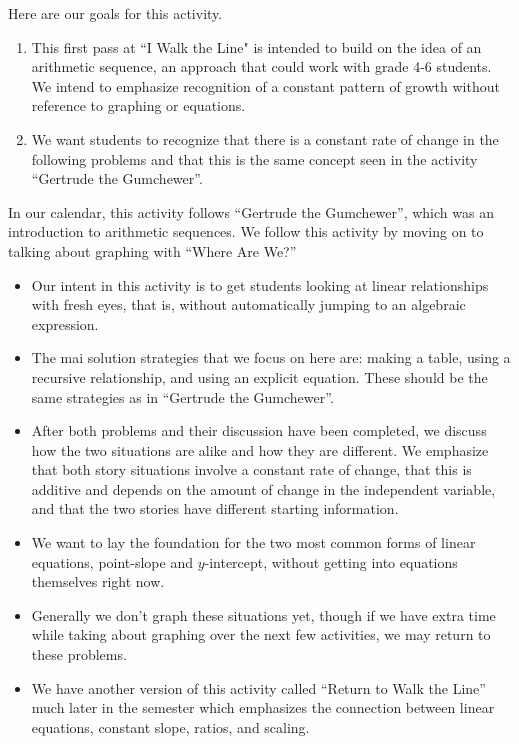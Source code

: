\documentclass{ximera}
\begin{document}
\begin{instructorNotes}
Here are our goals for this activity.
\begin{enumerate}
\item  This first pass at ``I Walk the Line" is intended to build on the idea of an arithmetic sequence, an approach that could work with grade 4-6 students.  We intend to emphasize  recognition of a constant pattern of growth without reference to graphing or equations.
\item We want students to recognize that there is a constant rate of change in the following problems and that this is the same concept seen in the activity ``Gertrude the Gumchewer''.
\end{enumerate}

In our calendar, this activity follows ``Gertrude the Gumchewer'', which was an introduction to arithmetic sequences.  We follow this activity by moving on to talking about graphing with ``Where Are We?''

\begin{itemize}
\item Our intent in this activity is to get students looking at linear relationships with fresh eyes, that is, without automatically jumping to an algebraic expression. 
\item The mai solution strategies that we focus on here are: making a table, using a recursive relationship, and using an explicit equation.  These should be the same strategies as in ``Gertrude the Gumchewer''.
\item  After both problems and their discussion have been completed, we discuss how the two situations are alike and how they are different.  We emphasize that both story situations involve a constant rate of change, that this is additive and depends on the amount of change in the independent variable, and that the two stories have different starting information.  
\item  We want to lay the foundation for the two most common forms of linear equations, point-slope and $y$-intercept, without getting into equations themselves right now. 
\item Generally we don't graph these situations yet, though if we have extra time while taking about graphing over the next few activities, we may return to these problems.
\item We have another version of this activity called ``Return to Walk the Line'' much later in the semester which emphasizes the connection between linear equations, constant slope, ratios, and scaling.
\end{itemize}

\end{instructorNotes}
\end{document}
